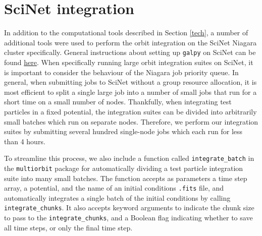 \documentclass[10pt]{article}
\begin{document}
\section{SciNet integration} \label{scinet}
In addition to the computational tools described in Section \ref{tech}, a number of additional tools were used to perform the orbit integration on the SciNet Niagara cluster specifically. General instructions about setting up \texttt{galpy} on SciNet can be found \href{https://github.com/mwbub/scinet-setup}{here}. When specifically running large orbit integration suites on SciNet, it is important to consider the behaviour of the Niagara job priority queue. In general, when submitting jobs to SciNet without a group resource allocation, it is most efficient to split a single large job into a number of small jobs that run for a short time on a small number of nodes. Thankfully, when integrating test particles in a fixed potential, the integration suites can be divided into arbitrarily small batches which run on separate nodes. Therefore, we perform our integration suites by submitting several hundred single-node jobs which each run for less than 4 hours. 

To streamline this process, we also include a function called \texttt{integrate\_batch} in the \texttt{multiorbit} package for automatically dividing a test particle integration suite into many small batches. The function accepts as parameters a time step array, a potential, and the name of an initial conditions \texttt{.fits} file, and automatically integrates a single batch of the initial conditions by calling \texttt{integrate\_chunks}. It also accepts keyword arguments to indicate the chunk size to pass to the \texttt{integrate\_chunks}, and a Boolean flag indicating whether to save all time steps, or only the final time step.
\end{document}
